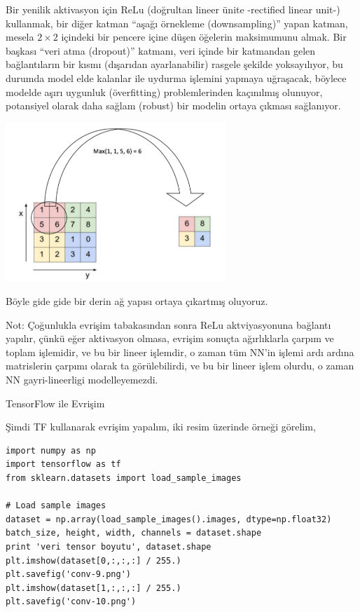 \documentclass[12pt,fleqn]{article}\usepackage{../../common}
\begin{document}
Bir yenilik aktivasyon için ReLu (doğrultan lineer ünite -rectified linear
unit-) kullanmak, bir diğer katman ``aşağı örnekleme (downsampling)'' yapan
katman, mesela $2 \times 2$ içindeki bir pencere içine düşen öğelerin
maksimumunu almak. Bir başkası ``veri atma (dropout)'' katmanı, veri içinde
bir katmandan gelen bağlantıların bir kısmı (dışarıdan ayarlanabilir)
rasgele şekilde yoksayılıyor, bu durumda model elde kalanlar ile uydurma
işlemini yapmaya uğraşacak, böylece modelde aşırı uygunluk (överfitting)
problemlerinden kaçınılmış olunuyor, potansiyel olarak daha sağlam (robust)
bir modelin ortaya çıkması sağlanıyor.

\includegraphics[height=6cm]{convnet_06.png}

Böyle gide gide bir derin ağ yapısı ortaya çıkartmış oluyoruz. 

Not: Çoğunlukla evrişim tabakasından sonra ReLu aktviyasyonuna bağlantı
yapılır, çünkü eğer aktivasyon olmasa, evrişim sonuçta ağırlıklarla çarpım
ve toplam işlemidir, ve bu bir lineer işlemdir, o zaman tüm NN'in işlemi
ardı ardına matrislerin çarpımı olarak ta görülebilirdi, ve bu bir lineer
işlem olurdu, o zaman NN gayri-lineerligi modelleyemezdi.

TensorFlow ile Evrişim

Şimdi TF kullanarak evrişim yapalım, iki resim üzerinde örneği görelim,

\begin{verbatim}
import numpy as np
import tensorflow as tf
from sklearn.datasets import load_sample_images

# Load sample images
dataset = np.array(load_sample_images().images, dtype=np.float32)
batch_size, height, width, channels = dataset.shape
print 'veri tensor boyutu', dataset.shape
plt.imshow(dataset[0,:,:,:] / 255.) 
plt.savefig('conv-9.png')
plt.imshow(dataset[1,:,:,:] / 255.) 
plt.savefig('conv-10.png')
\end{verbatim}
\end{document}
